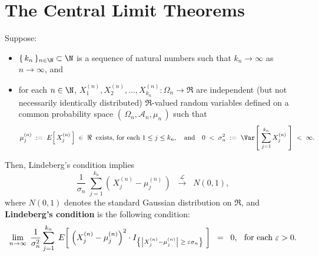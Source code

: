 

\section{The Central Limit Theorems}
\setcounter{theorem}{0}
\setcounter{equation}{0}

\renewcommand{\theenumi}{\alph{enumi}}
\renewcommand{\labelenumi}{\textnormal{(\theenumi)}$\;\;$}

\begin{theorem}
\mbox{}\vskip 0.2cm
\noindent
Suppose:
\begin{itemize}
\item	$\{\,k_{n}\,\}_{n\in\N}\subset\N$ is a sequence of natural numbers such that $k_{n} \rightarrow \infty$ as $n \rightarrow \infty$, and
\item	for each $n \in \N$, $X^{(n)}_{1}, X^{(n)}_{2}, \ldots, X^{(n)}_{k_{n}} : \Omega_{n} \longrightarrow \Re$
		are {\color{red}independent} (but not necessarily identically distributed)
		$\Re$-valued random variables defined on a common probability space
		$\left(\,\Omega_{n},\mathcal{A}_{n},\mu_{n}\,\right)$ such that
		\begin{equation*}
		\mu^{(n)}_{j} \;:=\; E\!\left[\,X^{(n)}_{j}\,\right] \;\in\; \Re \;\;\textnormal{exists, for each $1 \leq j \leq k_{n}$},
		\quad\textnormal{and}\quad
		0 \;<\; \sigma^{2}_{n} \;:=\; \Var\!\left[\;\overset{k_{n}}{\underset{j=1}{\sum}}\,X^{(n)}_{j}\;\right] \;<\; \infty.
		\end{equation*}
\end{itemize}
Then, Lindeberg's condition implies
\begin{equation*}
\dfrac{1}{\sigma_{n}}\;\sum^{k_{n}}_{j=1}\left(\,X^{(n)}_{j} - \mu^{(n)}_{j}\,\right)
\;\;\overset{\mathcal{L}}{\longrightarrow}\;\;
N(0,1),
\end{equation*}
where $N(0,1)$ denotes the standard Gaussian distribution on $\Re$,
and \textbf{Lindeberg's condition} is the following condition:
\begin{equation*}
\lim_{n\rightarrow\infty}\;
\dfrac{1}{\sigma^{2}_{n}}
\sum_{j=1}^{k_{n}}\;
E\!\left[\;
\left(X^{(n)}_{j} - \mu^{(n)}_{j}\right)^{2}
\cdot
I_{\left\{\left\vert X^{(n)}_{j} - \mu^{(n)}_{j}\right\vert \;\geq\; \varepsilon \sigma_{n}\right\}}
\;\right]
\;\;=\;\;
0,
\;\;\,
\textnormal{for each $\varepsilon > 0$}.
\end{equation*}
\end{theorem}

